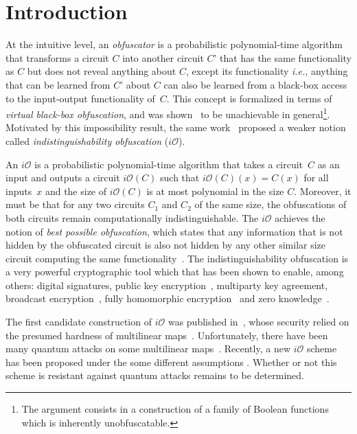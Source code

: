 \section{Introduction}
At the intuitive level, an \emph{obfuscator} is a probabilistic polynomial-time algorithm that  transforms a circuit $C$ into another circuit $C’$ that has the same functionality as $C$ but does not reveal anything about $C$, except its functionality \emph{i.e.}, anything that can be learned from $C’$ about $C$ can also be learned from a black-box access to the input-output functionality of~$C$. This concept is formalized in terms of \emph{virtual black-box obfuscation}, and was shown~\cite{BGI+12} to be unachievable in general\footnote{The argument consists in a construction of a family of Boolean functions which is inherently unobfuscatable.}. Motivated by this impossibility result, the same work~\cite{BGI+12} proposed a weaker notion called \emph{indistinguishability obfuscation} ($i\mathcal{O}$).

An $i\mathcal{O}$ is a probabilistic polynomial-time algorithm that takes a circuit~$C$ as an input and outputs a circuit $i\mathcal{O}(C)$ such that $i\mathcal{O}(C)(x)=C(x)$ for all inputs~$x$ and the size of $i\mathcal{O}(C)$ is at most polynomial in the size $C$. Moreover, it must be that for any two circuits $C_1$ and $C_2$ of the same size, the obfuscations of both circuits remain computationally indistinguishable. The $i\mathcal{O}$ achieves the notion of \emph{best possible obfuscation}, which states that any information that is not hidden by the obfuscated circuit is also not hidden by any other similar size circuit computing the same functionality~\cite{GR14}. The indistinguishability obfuscation is a very powerful cryptographic tool which that has been shown to enable, among others: digital signatures, public key encryption~\cite{SW14}, multiparty key agreement, broadcast encryption~\cite{BZ14}, fully homomorphic encryption~\cite{CLTV15} and zero knowledge~\cite{BP15}.

The first candidate construction of $i\mathcal{O}$ was published in~\cite{GGH+13}, whose security relied on the presumed hardness of multilinear maps~\cite{CLT13, LSS14, GGH15}. Unfortunately, there have been many quantum attacks on some multilinear maps~\cite{ABD16, CDPR16, CGH17}.  Recently, a new $i\mathcal{O}$ scheme has been proposed under the some different assumptions \cite{AJL+19}. Whether or not this scheme is resistant against quantum attacks remains to be determined.

